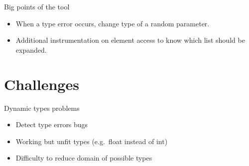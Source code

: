 \documentclass{beamer}
\begin{document}

\begin{frame}{Big points of the tool}
  \begin{itemize}
    \item When a type error occurs, change type of a random parameter.

    \item Additional instrumentation on element access to know which list should be expanded.
  \end{itemize}
\end{frame}




\section{Challenges}

\begin{frame}{Dynamic types problems}
  \begin{itemize}
    \item Detect type errors bugs
    \item Working but unfit types (e.g.\ float instead of int)
    \item Difficulty to reduce domain of possible types
  \end{itemize}
\end{frame}
\end{document}
